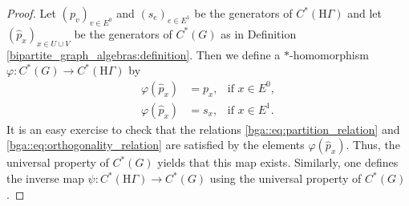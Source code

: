 \documentclass[a4paper]{amsart}
\newcommand{\Ha}{\mathrm{H}}
\begin{document}
\begin{proof}
    Let $(p_v)_{v \in E^0}$ and $(s_e)_{e \in E^1}$ be the generators of $C^\ast(\Ha\Gamma)$ and let $(\hat{p}_x)_{x \in U \cup V}$ be the generators of $C^\ast(G)$ as in Definition \ref{bipartite_graph_algebras:definition}. Then we define a $\ast$-homomorphism $\varphi: C^\ast(G) \to C^\ast(\Ha\Gamma)$ by
    \begin{align*}
        \varphi(\hat{p}_x) &= p_x, & \text{if } x \in E^0, \\
        \varphi(\hat{p}_x) &= s_x, & \text{if } x \in E^1.
    \end{align*}
    It is an easy exercise to check that the relations \eqref{bga::eq:partition_relation} and \eqref{bga::eq:orthogonality_relation} are satisfied by the elements $\varphi(\hat{p}_x)$. Thus, the universal property of $C^\ast(G)$ yields that this map exists. Similarly, one defines the inverse map $\psi: C^\ast(\Ha\Gamma) \to C^\ast(G)$ using the universal property of $C^\ast(G)$.

\end{proof}
\end{document}
